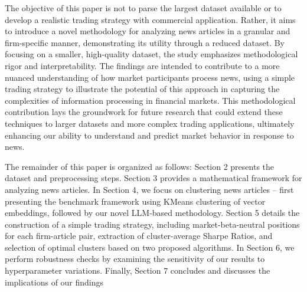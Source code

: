 \mx 
The objective of this paper is not to parse the largest dataset available or to develop a realistic trading strategy with commercial application. Rather, it aims to introduce a novel methodology for analyzing news articles in a granular and firm-specific manner, demonstrating its utility through a reduced dataset. By focusing on a smaller, high-quality dataset, the study emphasizes methodological rigor and interpretability. The findings are intended to contribute to a more nuanced understanding of how market participants process news, using a simple trading strategy to illustrate the potential of this approach in capturing the complexities of information processing in financial markets. This methodological contribution lays the groundwork for future research that could extend these techniques to larger datasets and more complex trading applications, ultimately enhancing our ability to understand and predict market behavior in response to news.

\mx 
The remainder of this paper is organized as follows: Section 2 presents the dataset and preprocessing steps. Section 3 provides a mathematical framework for analyzing news articles. In Section 4, we focus on clustering news articles -- first presenting the benchmark framework using KMeans clustering of vector embeddings, followed by our novel LLM-based methodology. Section 5 details the construction of a simple trading strategy, including market-beta-neutral positions for each firm-article pair, extraction of cluster-average Sharpe Ratios, and selection of optimal clusters based on two proposed algorithms. In Section 6, we perform robustness checks by examining the sensitivity of our results to hyperparameter variations. Finally, Section 7 concludes and discusses the implications of our findings






